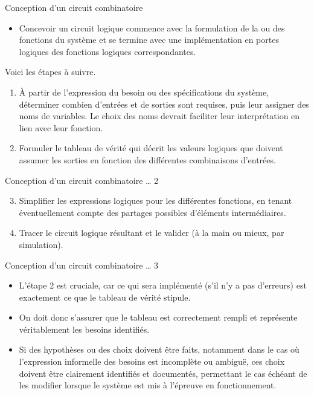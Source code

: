 \documentclass[presentation]{beamer}
\begin{document}
\begin{frame}[label={sec:org65fcfbd}]{Conception d'un circuit combinatoire}
\begin{itemize}
\item Concevoir un circuit logique commence avec la formulation de la ou des fonctions du système et se termine avec une implémentation en portes logiques des fonctions logiques correspondantes.
\end{itemize}

Voici les étapes à suivre.

\begin{enumerate}
\item À partir de l'expression du besoin ou des spécifications du
système, déterminer combien d'entrées et de sorties sont
requises, puis leur assigner des noms de variables. Le choix des noms
devrait faciliter leur interprétation en lien avec leur fonction.

\item Formuler le tableau de vérité qui décrit les valeurs logiques que
doivent assumer les sorties en fonction des différentes
combinaisons d'entrées.
\end{enumerate}
\end{frame}

\begin{frame}[label={sec:org424ad44}]{Conception d'un circuit combinatoire \ldots{} 2}
\begin{enumerate}
\setcounter{enumi}{2}
\item Simplifier les expressions logiques pour les différentes fonctions,
en tenant éventuellement compte des partages possibles d'éléments
intermédiaires.

\item Tracer le circuit logique résultant et le valider (à la main ou
mieux, par simulation).
\end{enumerate}
\end{frame}

\begin{frame}[label={sec:orgc61a26c}]{Conception d'un circuit combinatoire \ldots{} 3}
\begin{itemize}
\item L'étape 2 est cruciale, car ce qui sera implémenté (s'il n'y a pas d'erreurs) est exactement ce que le tableau de vérité stipule.

\item On doit donc s'assurer que le tableau est correctement rempli et représente véritablement les besoins identifiés.

\item Si des hypothèses ou des choix doivent être faits, notamment dans le cas où l'expression informelle des besoins est incomplète ou ambiguë, ces choix doivent être clairement identifiés et documentés, permettant le cas échéant de les modifier lorsque le système est mis à l'épreuve en fonctionnement.
\end{itemize}
\end{frame}
\end{document}
